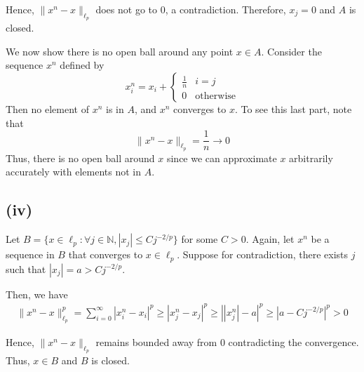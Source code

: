 \documentclass{article}
\numberwithin{equation}{section}
\theoremstyle{definition}
\newcommand{\set}[1]{\{#1\}}
\begin{document}
Hence, $\|x^n - x\|_{\ell_p}$ does not go to $0$, a contradiction. Therefore, $x_j = 0$ and $A$ is closed.

We now show there is no open ball around any point $x \in A$. Consider the sequence $x^n$ defined by
\begin{equation}
    x^n_i = x_i + 
        \left\{\begin{matrix}
            \frac 1n & i = j\\ 
            0 & \text{otherwise}
           \end{matrix}\right.
\end{equation}
Then no element of $x^n$ is in $A$, and $x^n$ converges to $x$. To see this last part, note that
\begin{equation}
    \|x^n - x\|_{\ell_p} = \frac 1n \to 0
\end{equation}
Thus, there is no open ball around $x$ since we can approximate $x$ arbitrarily accurately with elements not in $A$.

\subsection{(iv)}
Let $B = \set{x \in \ell_p: \forall j \in \mathbb{N}, |x_j| \leq Cj^{-2/p}}$ for some $C > 0$. Again, let $x^n$ be a sequence in $B$ that converges to $x \in \ell_p$. Suppose for contradiction, there exists $j$ such that $|x_j| = a > C j^{-2/p}$.

Then, we have
\begin{align}
    \|x^n - x\|_{\ell_p}^p = \sum_{i=0}^{\infty}|x_i^n - x_i|^p \geq |x_j^n - x_j|^p \geq \left||x_j^n| - a\right|^p \geq |a - C j^{-2/p}|^p > 0
\end{align}

Hence, $\|x^n - x\|_{\ell_p}$ remains bounded away from $0$ contradicting the convergence. Thus, $x \in B$ and $B$ is closed.

\end{document}
